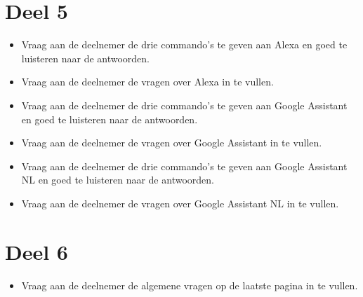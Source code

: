 \section{Deel 5}
\begin{itemize}
    \item Vraag aan de deelnemer de drie commando’s te geven aan Alexa en goed te luisteren naar de antwoorden.
    \item Vraag aan de deelnemer de vragen over Alexa in te vullen.
    \item Vraag aan de deelnemer de drie commando’s te geven aan Google Assistant en goed te luisteren naar de antwoorden.
    \item Vraag aan de deelnemer de vragen over Google Assistant in te vullen.
    \item Vraag aan de deelnemer de drie commando’s te geven aan Google Assistant NL en goed te luisteren naar de antwoorden.
    \item Vraag aan de deelnemer de vragen over Google Assistant NL in te vullen.
\end{itemize}

\section{Deel 6}
\begin{itemize}
    \item Vraag aan de deelnemer de algemene vragen op de laatste pagina in te vullen.
\end{itemize}